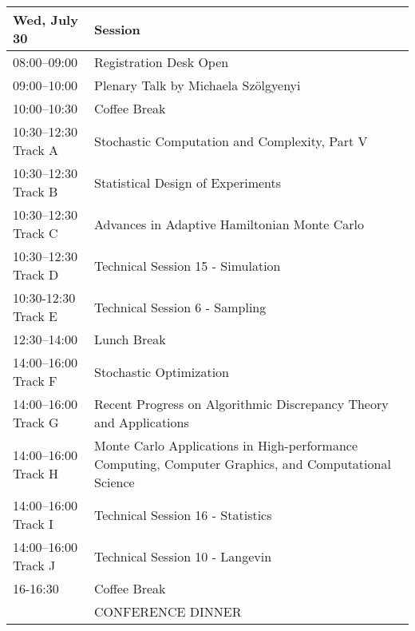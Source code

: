 \begin{table}
\begin{tabularx}{\textwidth}{>{\hsize=0.5\hsize}X|>{\hsize=1.5\hsize}X}
\hline
\textbf{Wed, July 30} & \textbf{Session} \\
\hline
\cellcolor{\EmptyColor}08:00–09:00 & \cellcolor{\EmptyColor}Registration Desk Open \\
\cellcolor{\PlenaryColor}09:00–10:00 & \cellcolor{\PlenaryColor}Plenary Talk by Michaela Szölgyenyi \\
\cellcolor{\EmptyColor}10:00–10:30 & \cellcolor{\EmptyColor}Coffee Break \\
\cellcolor{\SessionTitleColor}10:30–12:30 Track A & \cellcolor{\SessionTitleColor}Stochastic Computation and Complexity, Part V \\
\cellcolor{\SessionTitleColor}10:30–12:30 Track B & \cellcolor{\SessionTitleColor}Statistical Design of Experiments \\
\cellcolor{\SessionTitleColor}10:30–12:30 Track C & \cellcolor{\SessionTitleColor}Advances in Adaptive Hamiltonian Monte Carlo \\
\cellcolor{\SessionLightColor}10:30–12:30 Track D & \cellcolor{\SessionLightColor}Technical Session 15 - Simulation \\
\cellcolor{\SessionLightColor}10:30-12:30 Track E & \cellcolor{\SessionLightColor}Technical Session 6 - Sampling \\
\cellcolor{\EmptyColor}12:30–14:00 & \cellcolor{\EmptyColor}Lunch Break \\
\cellcolor{\SessionTitleColor}14:00–16:00 Track F & \cellcolor{\SessionTitleColor}Stochastic Optimization \\
\cellcolor{\SessionTitleColor}14:00–16:00 Track G & \cellcolor{\SessionTitleColor}Recent Progress on Algorithmic Discrepancy Theory and Applications \\
\cellcolor{\SessionTitleColor}14:00–16:00 Track H & \cellcolor{\SessionTitleColor}Monte Carlo Applications in High-performance Computing, Computer Graphics, and Computational Science \\
\cellcolor{\SessionLightColor}14:00–16:00 Track I & \cellcolor{\SessionLightColor}Technical Session 16 - Statistics \\
\cellcolor{\SessionLightColor}14:00–16:00 Track J & \cellcolor{\SessionLightColor}Technical Session 10 - Langevin \\
\cellcolor{\EmptyColor}16-16:30 & \cellcolor{\EmptyColor}Coffee Break \\
\cellcolor{\EmptyColor} & \cellcolor{\EmptyColor}CONFERENCE DINNER \\
\hline
\end{tabularx}
\end{table}

